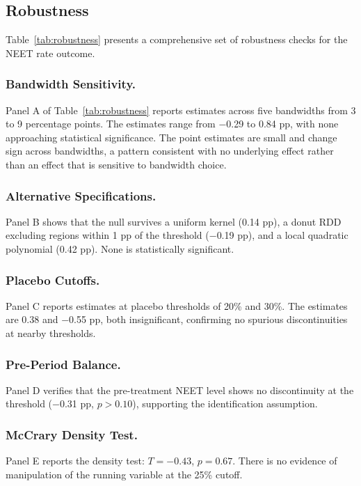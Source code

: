 \documentclass[12pt]{article}
\begin{document}


\subsection{Robustness}

Table~\ref{tab:robustness} presents a comprehensive set of robustness checks for the NEET rate outcome.



\subsubsection*{Bandwidth Sensitivity.} Panel A of Table~\ref{tab:robustness} reports estimates across five bandwidths from 3 to 9 percentage points. The estimates range from $-$0.29 to 0.84 pp, with none approaching statistical significance. The point estimates are small and change sign across bandwidths, a pattern consistent with no underlying effect rather than an effect that is sensitive to bandwidth choice.

\subsubsection*{Alternative Specifications.} Panel B shows that the null survives a uniform kernel (0.14 pp), a donut RDD excluding regions within 1 pp of the threshold ($-$0.19 pp), and a local quadratic polynomial (0.42 pp). None is statistically significant.

\subsubsection*{Placebo Cutoffs.} Panel C reports estimates at placebo thresholds of 20\% and 30\%. The estimates are 0.38 and $-$0.55 pp, both insignificant, confirming no spurious discontinuities at nearby thresholds.

\subsubsection*{Pre-Period Balance.} Panel D verifies that the pre-treatment NEET level shows no discontinuity at the threshold ($-$0.31 pp, $p > 0.10$), supporting the identification assumption.

\subsubsection*{McCrary Density Test.} Panel E reports the density test: $T = -0.43$, $p = 0.67$. There is no evidence of manipulation of the running variable at the 25\% cutoff.
\end{document}
